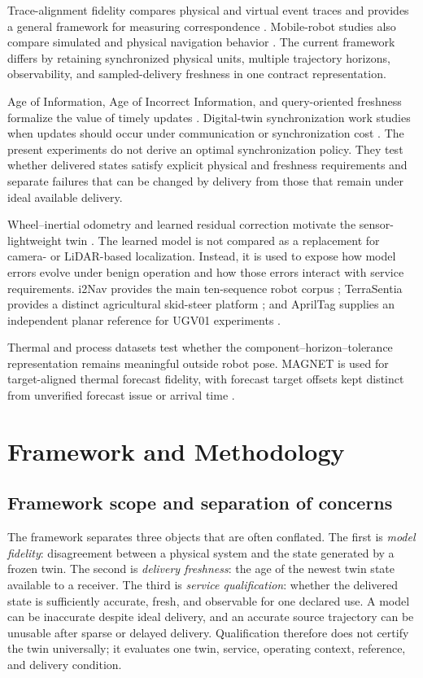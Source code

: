 \documentclass[journal,onecolumn]{IEEEtran}
\begin{document}
Trace-alignment fidelity compares physical and virtual event traces and provides a general framework for measuring correspondence \cite{munoz2024}. Mobile-robot studies also compare simulated and physical navigation behavior \cite{bergs2025}. The current framework differs by retaining synchronized physical units, multiple trajectory horizons, observability, and sampled-delivery freshness in one contract representation.

Age of Information, Age of Incorrect Information, and query-oriented freshness formalize the value of timely updates \cite{maatouk2023,chiariotti2022}. Digital-twin synchronization work studies when updates should occur under communication or synchronization cost \cite{tanmatta2024,li2025sync}. The present experiments do not derive an optimal synchronization policy. They test whether delivered states satisfy explicit physical and freshness requirements and separate failures that can be changed by delivery from those that remain under ideal available delivery.

Wheel--inertial odometry and learned residual correction motivate the sensor-lightweight twin \cite{brossard2019,jiang2025,zhou2025ynet}. The learned model is not compared as a replacement for camera- or LiDAR-based localization. Instead, it is used to expose how model errors evolve under benign operation and how those errors interact with service requirements. i2Nav provides the main ten-sequence robot corpus \cite{tang2025}; TerraSentia provides a distinct agricultural skid-steer platform \cite{cuaran2024}; and AprilTag supplies an independent planar reference for UGV01 experiments \cite{olson2011}.

Thermal and process datasets test whether the component--horizon--tolerance representation remains meaningful outside robot pose. MAGNET is used for target-aligned thermal forecast fidelity, with forecast target offsets kept distinct from unverified forecast issue or arrival time \cite{wilsdon2023magnet}.

\section{Framework and Methodology}
\subsection{Framework scope and separation of concerns}
The framework separates three objects that are often conflated. The first is \emph{model fidelity}: disagreement between a physical system and the state generated by a frozen twin. The second is \emph{delivery freshness}: the age of the newest twin state available to a receiver. The third is \emph{service qualification}: whether the delivered state is sufficiently accurate, fresh, and observable for one declared use. A model can be inaccurate despite ideal delivery, and an accurate source trajectory can be unusable after sparse or delayed delivery. Qualification therefore does not certify the twin universally; it evaluates one twin, service, operating context, reference, and delivery condition.
\end{document}
